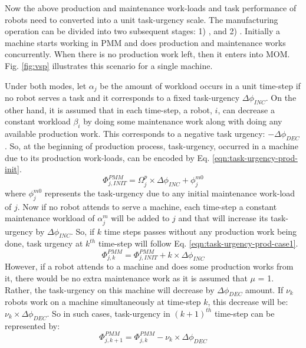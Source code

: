 Now the above production and maintenance work-loads and task performance of robots need to converted into a unit task-urgency scale. The manufacturing operation can be divided into two subsequent stages: 1) , and 2) . Initially a machine starts working in PMM and does production and maintenance works concurrently. When there is no production work left, then it  enters into MOM. Fig. \ref{fig:vsp} illustrates this scenario for a single machine.

Under both modes, let $\alpha_{j}$ be the amount of workload occurs in a unit time-step if no robot serves a task and it corresponds to a fixed task-urgency $\Delta \phi_{INC}$. On the other hand, it is assumed that in each time-step, a robot, $i$, can decrease a constant workload $\beta_{i}$ by doing some maintenance work along with doing any available production work. This  corresponds to a negative task urgency: $- \Delta \phi_{DEC}$. So, at the beginning of production process, task-urgency, occurred in a machine due to its production work-loads, can be encoded by Eq. \ref{eqn:task-urgency-prod-init}.
\begin{equation}
\Phi_{j, INIT}^{PMM} = \Omega_{j}^{p} \times \Delta \phi_{INC} + \phi_{j}^{m0}
\label{eqn:task-urgency-prod-init}
\end{equation}
where $\phi_{j}^{m0}$ represents the task-urgency due to any initial maintenance work-load of $j$.
Now if no robot attends to serve a machine, each time-step a constant maintenance workload of $\alpha_{j}^{m}$ will be added to $j$ and that will increase its task-urgency by $\Delta \phi_{INC}$. So, if $k$ time steps passes without any production work being done, task urgency at $k^{th}$ time-step will follow Eq. \ref{eqn:task-urgency-prod-case1}.
\begin{equation}
\Phi_{j, k}^{PMM} =\Phi_{j, INIT}^{PMM} + k \times \Delta \phi_{INC}
\label{eqn:task-urgency-prod-case1}
\end{equation}
However, if a robot attends to a machine and does some production works from it, there would be no extra maintenance work as it is assumed that $\mu$ = 1. Rather, the task-urgency on this machine will decrease by $\Delta \phi_{DEC}$ amount. If $\nu_{k}$ robots work on a machine simultaneously at time-step $k$, this decrease will be: $\nu_{k} \times \Delta \phi_{DEC}$. So in such cases, task-urgency in $(k+1)^{th}$ time-step can be represented by:
\begin{equation}
\Phi_{j, k+1}^{PMM} = \Phi_{j, k}^{PMM} - \nu_{k} \times \Delta \phi_{DEC}
\label{eqn:task-urgency-prod-case2}
\end{equation}
